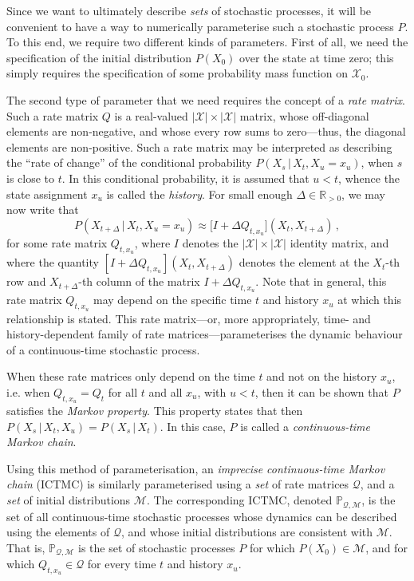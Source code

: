 \documentclass[twoside,11pt]{article}
\newcommand{\reals}{\mathbb{R}}
\newcommand{\realspos}{\reals_{>0}}
\newcommand{\states}{\mathcal{X}}
\newcommand{\rateset}{\mathcal{Q}}
\begin{document}
Since we want to ultimately describe \emph{sets} of stochastic processes, it will be convenient to have a way to numerically parameterise such a stochastic process $P$. To this end, we require two different kinds of parameters. First of all, we need the specification of the initial distribution $P(X_0)$ over the state at time zero; this simply requires the specification of some probability mass function on $\states_0$.

The second type of parameter that we need requires the concept of a \emph{rate matrix}. Such a rate matrix $Q$ is a real-valued $\lvert\states\rvert\times\lvert\states\rvert$ matrix, whose off-diagonal elements are non-negative, and whose every row sums to zero---thus, the diagonal elements are non-positive. Such a rate matrix may be interpreted as describing the ``rate of change'' of the conditional probability $P(X_s\,\vert\,X_t,X_u=x_u)$, when $s$ is close to $t$. In this conditional probability, it is assumed that $u<t$, whence the state assignment $x_u$ is called the \emph{history}. For small enough $\Delta\in\realspos$, we may now write that
\begin{equation*}
P(X_{t+\Delta}\,\vert\,X_t,X_u=x_u) \approx \bigl[I + \Delta Q_{t,x_u}\bigr](X_t, X_{t+\Delta})\,,
\end{equation*}
for some rate matrix $Q_{t,x_u}$, where $I$ denotes the $\lvert\states\rvert\times\lvert\states\rvert$ identity matrix, and where the quantity $[I + \Delta Q_{t,x_u}](X_t,X_{t+\Delta})$ denotes the element at the $X_t$-th row and $X_{t+\Delta}$-th column of the matrix $I + \Delta Q_{t,x_u}$. Note that in general, this rate matrix $Q_{t,x_u}$ may depend on the specific time $t$ and history $x_u$ at which this relationship is stated. This rate matrix---or, more appropriately, time- and history-dependent family of rate matrices---parameterises the dynamic behaviour of a continuous-time stochastic process.

When these rate matrices only depend on the time $t$ and not on the history $x_u$, i.e. when $Q_{t,x_u}=Q_t$ for all $t$ and all $x_u$, with $u<t$, then it can be shown that $P$ satisfies the \emph{Markov property}. This property states that then $P(X_s\,\vert\,X_t,X_u)=P(X_s\,\vert\,X_t)$. In this case, $P$ is called a \emph{continuous-time Markov chain}.

Using this method of parameterisation, an \emph{imprecise continuous-time Markov chain} (ICTMC) is similarly parameterised using a \emph{set} of rate matrices $\rateset$, and a \emph{set} of initial distributions $\mathcal{M}$. The corresponding ICTMC, denoted $\mathbb{P}_{\rateset,\mathcal{M}}$, is the set of all continuous-time stochastic processes whose dynamics can be described using the elements of $\rateset$, and whose initial distributions are consistent with $\mathcal{M}$. That is, $\mathbb{P}_{\rateset,\mathcal{M}}$ is the set of stochastic processes $P$ for which $P(X_0)\in\mathcal{M}$, and for which $Q_{t,x_u}\in\rateset$ for every time $t$ and history $x_u$.
\end{document}
